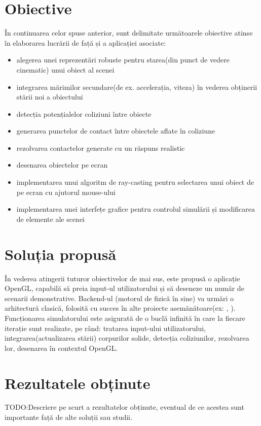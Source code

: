 \documentclass[12pt,a4paper]{report}
\begin{document}
\section{Obiective}
În continuarea celor spuse anterior, sunt delimitate următoarele obiective atinse în elaborarea lucrării de față și a aplicației asociate:
\begin{itemize}
	\item alegerea unei reprezentări robuste pentru starea(din punct de vedere cinematic) unui obiect al scenei
	\item integrarea mărimilor secundare(de ex. accelerația, viteza) în vederea obținerii stării noi a obiectului
	\item detecția potențialelor coliziuni între obiecte
	\item generarea punctelor de contact între obiectele aflate în coliziune
	\item rezolvarea contactelor generate cu un răspuns realistic
	\item desenarea obiectelor pe ecran
	\item implementarea unui algoritm de ray-casting pentru selectarea unui obiect de pe ecran cu ajutorul mouse-ului
	\item implementarea unei interfețe grafice pentru controlul simulării și modificarea de elemente ale scenei
\end{itemize}
\section{Soluția propusă} 
În vederea atingerii tuturor obiectivelor de mai sus, este propusă o aplicație OpenGL, capabilă să preia input-ul utilizatorului și să deseneze un număr de scenarii demonstrative.
Backend-ul (motorul de fizică în sine) va urmări o arhitectură clasică, folosită cu succes în alte proiecte asemănătoare(ex: \cite{box2D}, \cite{bullet}). Funcționarea simulatorului este asigurată de o buclă infinită în care la fiecare iterație sunt realizate, pe rând: tratarea input-ului utilizatorului, integrarea(actualizarea stării) corpurilor solide,
detecția coliziunilor, rezolvarea lor, desenarea în contextul OpenGL.
\section{Rezultatele obținute}
TODO:Descriere pe scurt a rezultatelor obținute, eventual de ce acestea sunt importante față de alte soluții sau studii.
\end{document}
